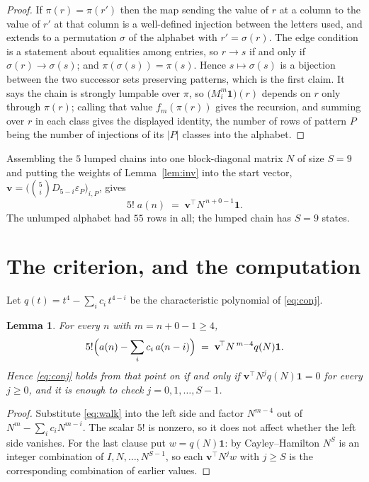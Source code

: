 \documentclass[11pt,a4paper]{article}
\theoremstyle{plain}
\newtheorem{lemma}[theorem]{Lemma}
\theoremstyle{definition}
\begin{document}
\begin{proof}
If $\pi(r)=\pi(r')$ then the map sending the value of $r$ at a column to the value of $r'$
at that column is a well-defined injection between the letters used, and extends to a
permutation $\sigma$ of the alphabet with $r'=\sigma(r)$. The edge condition is a statement
about equalities among entries, so $r\to s$ if and only if $\sigma(r)\to\sigma(s)$; and
$\pi(\sigma(s))=\pi(s)$. Hence $s\mapsto\sigma(s)$ is a bijection between the two successor
sets preserving patterns, which is the first claim. It says the chain is strongly lumpable
over $\pi$, so $\bigl(M_i^{m}\mathbf{1}\bigr)(r)$ depends on $r$ only through $\pi(r)$;
calling that value $f_m(\pi(r))$ gives the recursion, and summing over $r$ in each class
gives the displayed identity, the number of rows of pattern $P$ being the number of
injections of its $|P|$ classes into the alphabet.
\end{proof}

Assembling the $5$ lumped chains into one block-diagonal matrix $N$ of size $S=9$ and
putting the weights of Lemma~\ref{lem:inv} into the start vector,
$\mathbf{v}=\bigl(\binom{5}{i}D_{5-i}\varepsilon_P\bigr)_{i,P}$, gives
\begin{equation}\label{eq:walk}
5!\;a(n)\;=\;\mathbf{v}^{\!\top}N^{\,n+0-1}\mathbf{1} .
\end{equation}
The unlumped alphabet had $55$ rows in all; the lumped chain has $S=9$ states.

\section{The criterion, and the computation}

Let $q(t)=t^{4}-\sum_i c_i\,t^{4-i}$ be the characteristic polynomial of
\eqref{eq:conj}.

\begin{lemma}\label{lem:crit}
For every $n$ with $m=n+0-1\ge4$,
\[
5!\Bigl(a(n)-\sum_i c_i\,a(n-i)\Bigr)\;=\;\mathbf{v}^{\!\top}N^{\,m-4}q(N)\mathbf{1} .
\]
Hence \eqref{eq:conj} holds from that point on if and only if
$\mathbf{v}^{\!\top}N^{j}q(N)\mathbf{1}=0$ for every $j\ge0$, and it is enough to check
$j=0,1,\dots,S-1$.
\end{lemma}

\begin{proof}
Substitute \eqref{eq:walk} into the left side and factor $N^{m-4}$ out of
$N^{m}-\sum_i c_iN^{m-i}$. The scalar $5!$ is nonzero, so it does not affect whether
the left side vanishes. For the last clause put $w=q(N)\mathbf{1}$: by Cayley--Hamilton
$N^{S}$ is an integer combination of $I,N,\dots,N^{S-1}$, so each
$\mathbf{v}^{\!\top}N^{j}w$ with $j\ge S$ is the corresponding combination of earlier
values.
\end{proof}
\end{document}
